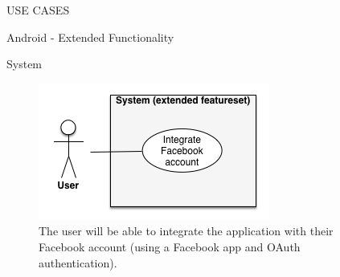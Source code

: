 \documentclass{article}
\begin{document}
\begin{section}{USE CASES}
\begin{subsection}{Android - Extended Functionality}
			\begin{subsubsection}{System}
				\begin{figure}[h!]
					\begin{center}
						\includegraphics[height=0.3\columnwidth]{images/UseCase/Android/Extended/System_Extended.png}
					\end{center}
					\caption{The user will be able to integrate the application with their Facebook account (using a Facebook app and OAuth authentication).}
				\end{figure}
			\end{subsubsection}
		\end{subsection}
		

\end{section}
\end{document}

